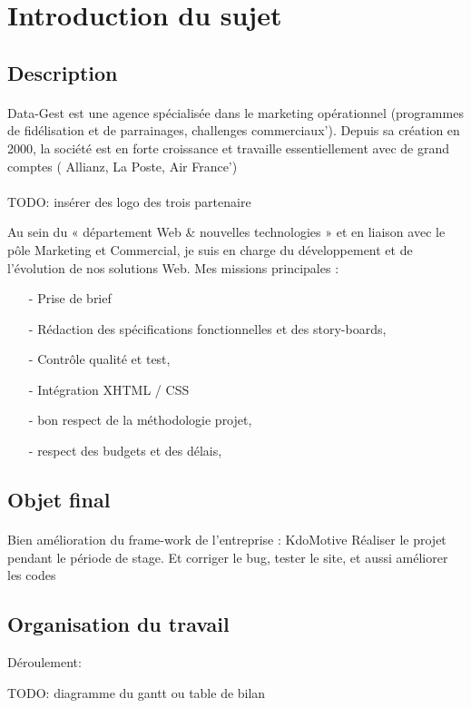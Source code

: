 \section{Introduction du sujet}
\justifying
\subsection{Description}
\paragraph{}
Data-Gest est une agence spécialisée dans le marketing opérationnel (programmes de fidélisation et de parrainages, challenges commerciaux'). Depuis sa création en 2000, la société est en forte croissance et travaille essentiellement avec de grand comptes ( Allianz, La Poste, Air France')
\paragraph{}

TODO: insérer des logo des trois partenaire

Au sein du « département Web \& nouvelles technologies » et en liaison avec le pôle Marketing et Commercial, je suis en charge du développement et de l'évolution de nos solutions Web. 
Mes missions principales :

\begin{itemize}
  \item [-]Prise de brief 
  \item [-]Rédaction des spécifications fonctionnelles et des story-boards, 
  \item [-]Contrôle qualité et test, 
  \item [-]Intégration XHTML / CSS
  \item [-]bon respect de la méthodologie projet,
  \item [-]respect des budgets et des délais, 
\end{itemize}

\subsection{Objet final}
\paragraph{}
Bien amélioration du frame-work de l'entreprise : KdoMotive
Réaliser le projet pendant le période de stage. Et corriger le bug, tester le site, et aussi améliorer les codes

\subsection{Organisation du travail}
Déroulement:

TODO: diagramme du gantt
ou table de bilan
%

